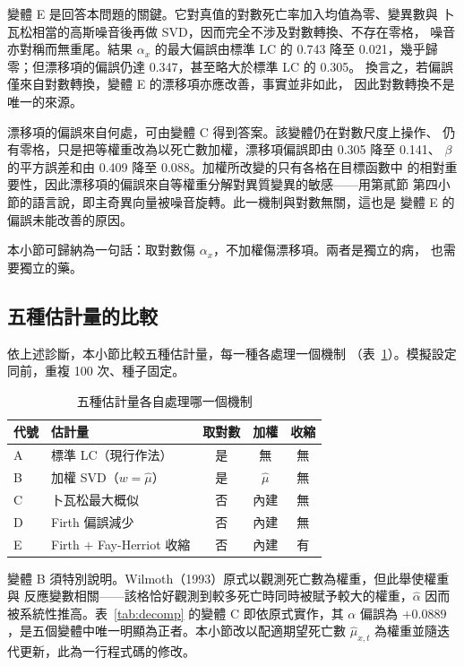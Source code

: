 \documentclass[UTF8, fontset=macnew, a4paper, 12pt]{ctexart}
\begin{document}
變體 E 是回答本問題的關鍵。它對真值的對數死亡率加入均值為零、變異數與
卜瓦松相當的高斯噪音後再做 SVD，因而完全不涉及對數轉換、不存在零格，
噪音亦對稱而無重尾。結果 $\alpha_x$ 的最大偏誤由標準 LC 的 0.743 降至
0.021，幾乎歸零；但漂移項的偏誤仍達 0.347，甚至略大於標準 LC 的 0.305。
換言之，若偏誤僅來自對數轉換，變體 E 的漂移項亦應改善，事實並非如此，
因此對數轉換不是唯一的來源。

漂移項的偏誤來自何處，可由變體 C 得到答案。該變體仍在對數尺度上操作、
仍有零格，只是把等權重改為以死亡數加權，漂移項偏誤即由 0.305 降至 0.141、
$\beta$ 的平方誤差和由 0.409 降至 0.088。加權所改變的只有各格在目標函數中
的相對重要性，因此漂移項的偏誤來自等權重分解對異質變異的敏感——用第貳節
第四小節的語言說，即主奇異向量被噪音旋轉。此一機制與對數無關，這也是
變體 E 的偏誤未能改善的原因。

本小節可歸納為一句話：取對數傷 $\alpha_x$，不加權傷漂移項。兩者是獨立的病，
也需要獨立的藥。

\subsection{五種估計量的比較}\label{sec:est}

依上述診斷，本小節比較五種估計量，每一種各處理一個機制
（表~\ref{tab:estdesign}）。模擬設定同前，重複 100 次、種子固定。

\begin{table}[H]
  \centering
  \caption{五種估計量各自處理哪一個機制}
  \label{tab:estdesign}
  \small
  \begin{tabular}{llccc}
    \toprule
    代號 & 估計量 & 取對數 & 加權 & 收縮 \\
    \midrule
    A & 標準 LC（現行作法）        & 是 & 無     & 無 \\
    B & 加權 SVD（$w=\hat\mu$）    & 是 & $\hat\mu$ & 無 \\
    C & 卜瓦松最大概似             & 否 & 內建   & 無 \\
    D & Firth 偏誤減少             & 否 & 內建   & 無 \\
    E & Firth $+$ Fay-Herriot 收縮 & 否 & 內建   & 有 \\
    \bottomrule
  \end{tabular}
\end{table}

變體 B 須特別說明。Wilmoth（1993）原式以觀測死亡數為權重，但此舉使權重與
反應變數相關——該格恰好觀測到較多死亡時同時被賦予較大的權重，$\hat\alpha$
因而被系統性推高。表~\ref{tab:decomp} 的變體 C 即依原式實作，其 $\alpha$
偏誤為 $+0.0889$，是五個變體中唯一明顯為正者。本小節改以配適期望死亡數
$\hat\mu_{x,t}$ 為權重並隨迭代更新，此為一行程式碼的修改。
\end{document}
